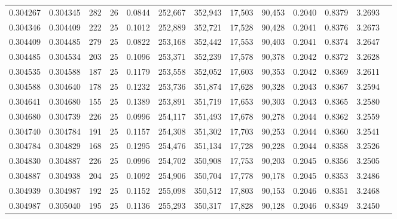 \begin{tabular}{rrrrrrrrrrrrr}
0.304267 & 0.304345 &   282 &  26 &                                     0.0844 & 252,667 & 352,943 &  17,503 &  90,453 & 0.2040 & 0.8379 & 3.2693 \\
0.304346 & 0.304409 &   222 &  25 &                                     0.1012 & 252,889 & 352,721 &  17,528 &  90,428 & 0.2041 & 0.8376 & 3.2673 \\
0.304409 & 0.304485 &   279 &  25 &                                     0.0822 & 253,168 & 352,442 &  17,553 &  90,403 & 0.2041 & 0.8374 & 3.2647 \\
0.304485 & 0.304534 &   203 &  25 &                                     0.1096 & 253,371 & 352,239 &  17,578 &  90,378 & 0.2042 & 0.8372 & 3.2628 \\
0.304535 & 0.304588 &   187 &  25 &                                     0.1179 & 253,558 & 352,052 &  17,603 &  90,353 & 0.2042 & 0.8369 & 3.2611 \\
0.304588 & 0.304640 &   178 &  25 &                                     0.1232 & 253,736 & 351,874 &  17,628 &  90,328 & 0.2043 & 0.8367 & 3.2594 \\
0.304641 & 0.304680 &   155 &  25 &                                     0.1389 & 253,891 & 351,719 &  17,653 &  90,303 & 0.2043 & 0.8365 & 3.2580 \\
0.304680 & 0.304739 &   226 &  25 &                                     0.0996 & 254,117 & 351,493 &  17,678 &  90,278 & 0.2044 & 0.8362 & 3.2559 \\
0.304740 & 0.304784 &   191 &  25 &                                     0.1157 & 254,308 & 351,302 &  17,703 &  90,253 & 0.2044 & 0.8360 & 3.2541 \\
0.304784 & 0.304829 &   168 &  25 &                                     0.1295 & 254,476 & 351,134 &  17,728 &  90,228 & 0.2044 & 0.8358 & 3.2526 \\
0.304830 & 0.304887 &   226 &  25 &                                     0.0996 & 254,702 & 350,908 &  17,753 &  90,203 & 0.2045 & 0.8356 & 3.2505 \\
0.304887 & 0.304938 &   204 &  25 &                                     0.1092 & 254,906 & 350,704 &  17,778 &  90,178 & 0.2045 & 0.8353 & 3.2486 \\
0.304939 & 0.304987 &   192 &  25 &                                     0.1152 & 255,098 & 350,512 &  17,803 &  90,153 & 0.2046 & 0.8351 & 3.2468 \\
0.304987 & 0.305040 &   195 &  25 &                                     0.1136 & 255,293 & 350,317 &  17,828 &  90,128 & 0.2046 & 0.8349 & 3.2450 \\

\end{tabular}
